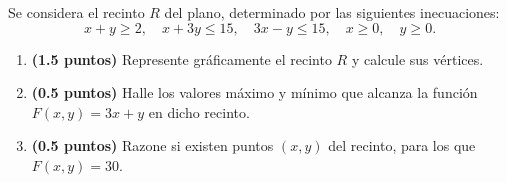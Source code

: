 
Se considera el recinto $R$ del plano, determinado por las siguientes inecuaciones:
\[
x+y\geq2,\quad x+3y\leq15,\quad3x-y\leq15,\quad x\geq0,\quad y\geq0.
\]
\begin{enumerate}[label=\alph*)]
\item \textbf{(1.5 puntos)} Represente gráficamente el recinto $R$ y calcule sus vértices.
\item \textbf{(0.5 puntos)} Halle los valores máximo y mínimo que alcanza la función $F(x,y)=3x+y$ en dicho recinto.
\item \textbf{(0.5 puntos)} Razone si existen puntos $(x,y)$ del recinto, para los que $F(x,y)=30$.
\end{enumerate}
